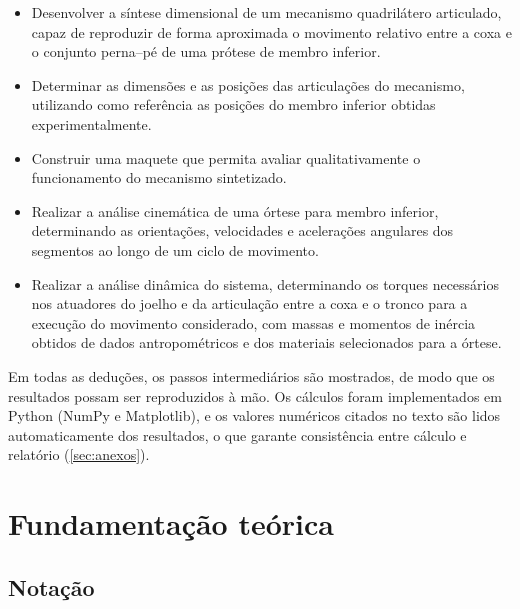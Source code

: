 \documentclass[12pt,a4paper,twoside]{article}
\numberwithin{equation}{section}
\begin{document}
\begin{itemize}
  \item Desenvolver a síntese dimensional de um mecanismo quadrilátero articulado,
  capaz de reproduzir de forma aproximada o movimento relativo entre a coxa e o
  conjunto perna--pé de uma prótese de membro inferior.
  \item Determinar as dimensões e as posições das articulações do mecanismo, utilizando
  como referência as posições do membro inferior obtidas experimentalmente.
  \item Construir uma maquete que permita avaliar qualitativamente o funcionamento do
  mecanismo sintetizado.
  \item Realizar a análise cinemática de uma órtese para membro inferior, determinando
  as orientações, velocidades e acelerações angulares dos segmentos ao longo de um
  ciclo de movimento.
  \item Realizar a análise dinâmica do sistema, determinando os torques necessários nos
  atuadores do joelho e da articulação entre a coxa e o tronco para a execução do
  movimento considerado, com massas e momentos de inércia obtidos de dados
  antropométricos e dos materiais selecionados para a órtese.
\end{itemize}

Em todas as deduções, os passos intermediários são mostrados, de modo que os
resultados possam ser reproduzidos à mão. Os cálculos foram implementados em Python
(NumPy e Matplotlib), e os valores numéricos citados no texto são lidos
automaticamente dos resultados, o que garante consistência entre cálculo e relatório
(\cref{sec:anexos}).

\section{Fundamentação teórica}\label{cap:teoria1}

\subsection{Notação}\label{sec:notacao}
\end{document}
